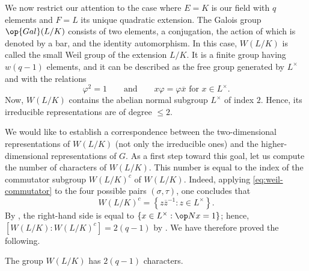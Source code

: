 \documentclass[../main.tex]{subfiles}
\begin{document}
We now restrict our attention to the case where $E=K$ is our field with $q$ elements and $F=L$ its unique quadratic extension. The Galois group $\op{Gal}(L/K)$ consists of two elements, a conjugation, the action of which is denoted by a bar, and the identity automorphism. In this case, $W(L/K)$ is called the small Weil group of the extension $L/K$. It is a finite group having $w(q-1)$ elements, and it can be described as the free group generated by $L^\times$ and with the relations
\begin{equation}
	\varphi^2=1\qquad\text{and}\qquad x\varphi=\varphi\overline x\text{ for }x\in L^\times. \label{eq:weil-relations}
\end{equation}
Now, $W(L/K)$ contains the abelian normal subgroup $L^\times$ of index $2$. Hence, its irreducible representations are of degree $\le2$.

We would like to establish a correspondence between the two-dimensional representations of $W(L/K)$ (not only the irreducible ones) and the higher-dimensional representations of $G$. As a first step toward this goal, let us compute the number of characters of $W(L/K)$. This number is equal to the index of the commutator subgroup $W(L/K)^c$ of $W(L/K)$. Indeed, applying \eqref{eq:weil-commutator} to the four possible pairs $(\sigma,\tau)$, one concludes that
\begin{equation}
	W(L/K)^c=\left\{z\overline z^{-1}:z\in L^\times\right\}. \label{eq:all-weil-commutators}
\end{equation}
By , the right-hand side is equal to $\left\{x\in L^\times:\op Nx=1\right\}$; hence, $\left[W(L/K):W(L/K)^c\right]=2(q-1)$ by . We have therefore proved the following.
\begin{lemma}
	The group $W(L/K)$ has $2(q-1)$ characters.
\end{lemma}
\end{document}
